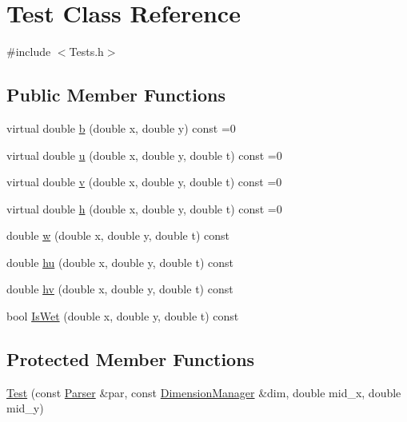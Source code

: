 \hypertarget{classTest}{}\section{Test Class Reference}
\label{classTest}


{\ttfamily \#include $<$Tests.\+h$>$}

\subsection*{Public Member Functions}
\begin{DoxyCompactItemize}
\item 
virtual double \hyperlink{classTest_a7bddd128de5558db4bae9a7542c8ae81}{b} (double x, double y) const =0
\item 
virtual double \hyperlink{classTest_a91fdf3bb74a1fc0e7e95895acb94085a}{u} (double x, double y, double t) const =0
\item 
virtual double \hyperlink{classTest_a9a2696e671a1903b0dd3c84178e3f73f}{v} (double x, double y, double t) const =0
\item 
virtual double \hyperlink{classTest_a44ddc98e99388649978d7fb0c8173a9f}{h} (double x, double y, double t) const =0
\item 
double \hyperlink{classTest_ab61819f5c55c179a658189ea22f0e15c}{w} (double x, double y, double t) const
\item 
double \hyperlink{classTest_a2c4d70064a7362c32cd448da297f96e2}{hu} (double x, double y, double t) const
\item 
double \hyperlink{classTest_ab46622c3a857f2b905b2a309115b1724}{hv} (double x, double y, double t) const
\item 
bool \hyperlink{classTest_a29b85d12854775c09443df57138908b5}{Is\+Wet} (double x, double y, double t) const
\end{DoxyCompactItemize}
\subsection*{Protected Member Functions}
\begin{DoxyCompactItemize}
\item 
\hyperlink{classTest_a1c7a5a927ffee04c0061ffb70ac33119}{Test} (const \hyperlink{structParser}{Parser} \&par, const \hyperlink{structDimensionManager}{Dimension\+Manager} \&dim, double mid\+\_\+x, double mid\+\_\+y)
\end{DoxyCompactItemize}
